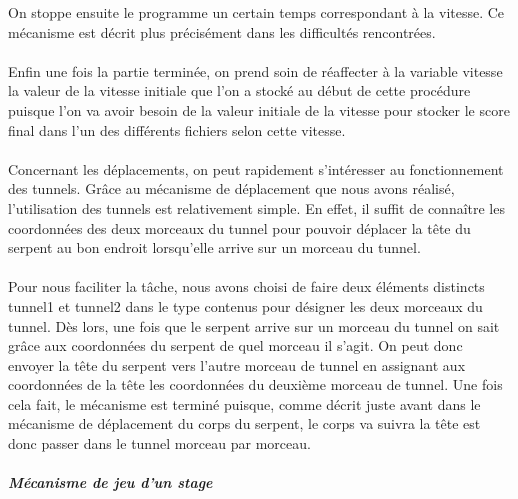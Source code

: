 \documentclass[11pt,a4paper]{article}
\begin{document}
        On stoppe ensuite le programme un certain temps correspondant à la vitesse. Ce mécanisme est décrit plus précisément dans les difficultés rencontrées.\\\\
        Enfin une fois la partie terminée, on prend soin de réaffecter à la variable vitesse la valeur de la vitesse initiale que l’on a stocké au début de cette procédure puisque l’on va avoir besoin de la valeur initiale de la vitesse pour stocker le score final dans l’un des différents fichiers selon cette vitesse.\\\\

        
        Concernant les déplacements, on peut rapidement s’intéresser au fonctionnement des tunnels. Grâce au mécanisme de déplacement que nous avons réalisé, l’utilisation des tunnels est relativement simple. En effet, il suffit de connaître les coordonnées des deux morceaux du tunnel pour pouvoir déplacer la tête du serpent au bon endroit lorsqu’elle arrive sur un morceau du tunnel.\\\\
        Pour nous faciliter la tâche, nous avons choisi de faire deux éléments distincts tunnel1 et tunnel2 dans le type contenus pour désigner les deux morceaux du tunnel. Dès lors, une fois que le serpent arrive sur un morceau du tunnel on sait grâce aux coordonnées du serpent de quel morceau il s’agit. On peut donc envoyer la tête du serpent vers l’autre morceau de tunnel en assignant aux coordonnées de la tête les coordonnées du deuxième morceau de tunnel. Une fois cela fait, le mécanisme est terminé puisque, comme décrit juste avant dans le mécanisme de déplacement du corps du serpent, le corps va suivra la tête est donc passer dans le tunnel morceau par morceau. \\\\
        
        \textit{\textbf{Mécanisme de jeu d'un stage}}\\
        
\end{document}
